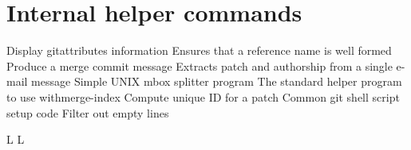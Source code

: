 \section{Internal helper commands}{}
	{Display gitattributes information}
	{Ensures that a reference name is well formed}
	{Produce a merge commit message}
	{Extracts patch and authorship from a single e-mail message}
	{Simple UNIX mbox splitter program}
	{The standard helper program to use withmerge-index}
	{Compute unique ID for a patch}
	{Common git shell script setup code}
	{Filter out empty lines}

\copyrightnotice

\supereject
\if L\lr \else\null\vfill\eject\fi
\if L\lr \else\null\vfill\eject\fi
\bye

